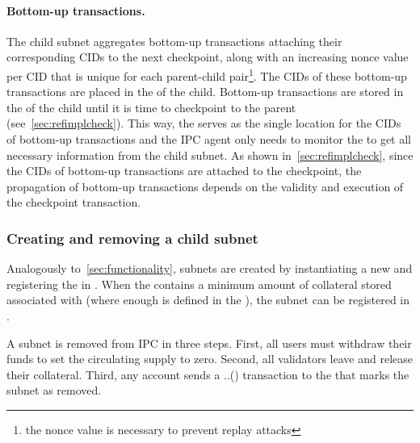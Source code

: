 \paragraph{Bottom-up transactions.}  
The child subnet aggregates bottom-up transactions attaching their corresponding CIDs to the next checkpoint, along with an increasing nonce value per CID that is unique for each parent-child pair\footnote{the nonce value is necessary to prevent replay attacks}. The CIDs of these bottom-up transactions are placed in the \gw of the child. Bottom-up transactions are stored in the \gw of the child until it is time to checkpoint to the parent (see~\cref{sec:refimplcheck}). This way, the \gw serves as the single location for the CIDs of bottom-up transactions and the IPC agent only needs to monitor the \gw to get all necessary information from the child subnet. As shown in~\cref{sec:refimplcheck}, since the CIDs of bottom-up transactions are attached to the checkpoint, the propagation of bottom-up transactions depends on the validity and execution of the checkpoint transaction. 


\subsubsection{Creating and removing a child subnet} Analogously to~\cref{sec:functionality}, subnets are created by instantiating a new \sa and registering the \sa in \gw. When the \gw contains a minimum amount of collateral stored associated with \sa (where enough is defined in the \gw), the subnet can be registered in \gw. 

A subnet  is removed from IPC in three steps. First, all users must withdraw their funds to set the circulating supply to zero. Second, all validators leave and release their collateral. Third, any account sends a .\gw.() transaction to the \gw that marks the subnet as removed.

